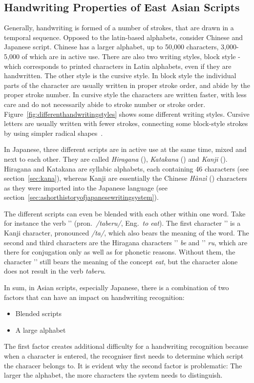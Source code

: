 \subsection{Handwriting Properties of East Asian Scripts}
\label{sec:handwritingpropertieseastasian}

Generally, handwriting is formed of a number of strokes, that are drawn
in a temporal sequence. Opposed to the latin-based alphabets, consider Chinese 
and Japanese script. Chinese has a larger alphabet, up to 50,000 characters, 
3,000-5,000 of which are in active use. There are also two writing styles,
block style - which corresponds to printed characters in Latin alphabets,
even if they are handwritten. The other style is the cursive style. In block 
style the individual parts of the character are usually written in proper 
stroke order, and abide by the proper stroke number. In cursive style 
the characters are written faster, with less care and do not necessarily abide 
to stroke number or stroke order. 
Figure~\ref{fig:differenthandwritingstyles}
shows some different writing styles.
Cursive letters are usually written with fewer strokes,
connecting some block-style strokes by using simpler radical 
shapes~.

In Japanese, three different scripts are in active use at the same time,
mixed and next to each other. They are called \emph{Hiragana} (), 
\emph{Katakana} () and \emph{Kanji} ().
Hiragana and Katakana are syllabic alphabets, each containing 46 characters
(see section~\ref{sec:kana}), whereas Kanji are essentially the Chinese 
\emph{Hànzì} () characters as they were imported into the Japanese 
language (see section~\ref{sec:ashorthistoryofjapanesewritingsystem}).

The different scripts can even be blended with each other within one word. 
Take for instance the verb '' (pron.\ \emph{/taberu/}, 
Eng.\ \emph{to eat}). 
The first character '' is a Kanji character, pronounced \emph{/ta/}, 
which also bears the meaning of the word. The second and third characters 
are the Hiragana characters '' \emph{be} and '' \emph{ru}, 
which are there for conjugation only as well as for phonetic reasons. 
Without them, the character '' still bears the meaning of the concept 
\emph{eat}, but the character alone does not result in the verb \emph{taberu}.

In sum, in Asian scripts, especially Japanese, there is a combination of 
two factors that can have an impact on handwriting recognition: 
\begin{itemize}
\item Blended scripts
\item A large alphabet
\end{itemize}
The first factor creates additional difficulty for a handwriting recognition 
because when a character is entered, the recogniser first needs to determine 
which script the characer belongs to. 
It is evident why the second factor is problematic: The larger the alphabet,
the more characters the system needs to distinguish.

